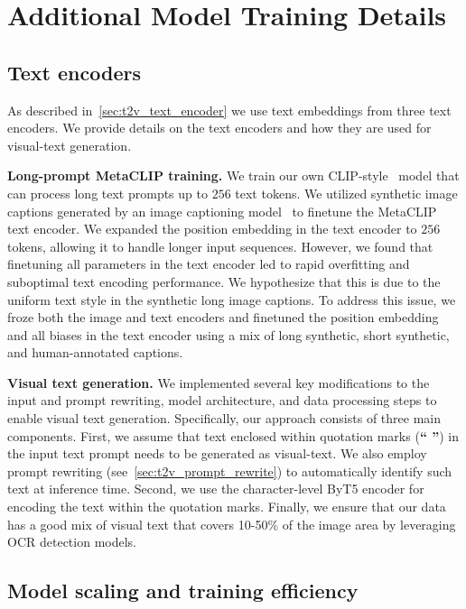 
\section{Additional Model Training Details}

\subsection{Text encoders}
As described in~\cref{sec:t2v_text_encoder} we use text embeddings from three text encoders.
We provide details on the text encoders and how they are used for visual-text generation.

\noindent \textbf{Long-prompt MetaCLIP training.}
We train our own CLIP-style~\citep{xu2023demystifying} model that can process long text prompts up to $256$ text tokens.
We utilized synthetic image captions generated by an image captioning model~\citep{llama3} to finetune the MetaCLIP~\citep{xu2023demystifying} text encoder.
We expanded the position embedding in the text encoder to $256$ tokens, allowing it to handle longer input sequences.
However, we found that finetuning all parameters in the text encoder led to rapid overfitting and suboptimal text encoding performance.
We hypothesize that this is due to the uniform text style in the synthetic long image captions.
To address this issue, we froze both the image and text encoders and finetuned the position embedding and all biases in the text encoder using a mix of long synthetic, short synthetic, and human-annotated captions.

\par \noindent \textbf{Visual text generation.}
We implemented several key modifications to the input and prompt rewriting, model architecture, and data processing steps to enable visual text generation.
Specifically, our approach consists of three main components.
First, we assume that text enclosed within quotation marks (\textbf{`` ''}) in the input text prompt needs to be generated as visual-text.
We also employ prompt rewriting (see~\cref{sec:t2v_prompt_rewrite}) to automatically identify such text at inference time.
Second, we use the character-level ByT5 encoder for encoding the text within the quotation marks.
Finally, we ensure that our \pretraining data has a good mix of visual text that covers 10-50\% of the image area by leveraging OCR detection models.





\subsection{Model scaling and training efficiency}
\label{app:t2v_impl_scaling_additional}

